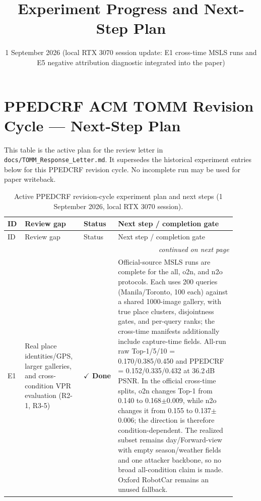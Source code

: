 \documentclass[11pt]{article}
\title{\textbf{Experiment Progress and Next-Step Plan}}
\author{}
\date{1 September 2026 (local RTX 3070 session update: E1 cross-time MSLS runs and E5 negative attribution diagnostic integrated into the paper)}
\newcommand{\done}{\textcolor{DoneGreen}{\textbf{$\checkmark$ Done}}}
\begin{document}
\maketitle

\section*{PPEDCRF ACM TOMM Revision Cycle --- Next-Step Plan}

This table is the active plan for the review letter in
\texttt{docs/TOMM\_Response\_Letter.md}. It supersedes the historical
experiment entries below for this PPEDCRF revision cycle. No incomplete run
may be used for paper writeback.

\begin{longtable}{@{}p{0.05\linewidth}p{0.23\linewidth}p{0.14\linewidth}p{0.48\linewidth}@{}}
\caption{Active PPEDCRF revision-cycle experiment plan and next steps (1 September 2026, local RTX 3070 session).}
\label{tab:ppedcrf-next-step}\\
\toprule
ID & Review gap & Status & Next step / completion gate \\
\midrule
\endfirsthead
\toprule
ID & Review gap & Status & Next step / completion gate \\
\midrule
\endhead
\midrule
\multicolumn{4}{r}{\itshape continued on next page} \\
\endfoot
\bottomrule
\endlastfoot
E1 & Real place identities/GPS, larger galleries, and cross-condition VPR evaluation (R2-1, R3-5) & \done & Official-source MSLS runs are complete for the all, o2n, and n2o protocols. Each uses 200 queries (Manila/Toronto, 100 each) against a shared 1000-image gallery, with true place clusters, disjointness gates, and per-query ranks; the cross-time manifests additionally include capture-time fields. All-run raw Top-1/5/10 = 0.170/0.385/0.450 and PPEDCRF = 0.152/0.335/0.432 at 36.2\,dB PSNR. In the official cross-time splits, o2n changes Top-1 from 0.140 to 0.168$\pm$0.009, while n2o changes it from 0.155 to 0.137$\pm$0.006; the direction is therefore condition-dependent. The realized subset remains day/Forward-view with empty season/weather fields and one attacker backbone, so no broad all-condition claim is made. Oxford RobotCar remains an unused fallback. \\

\end{longtable}
\end{document}
